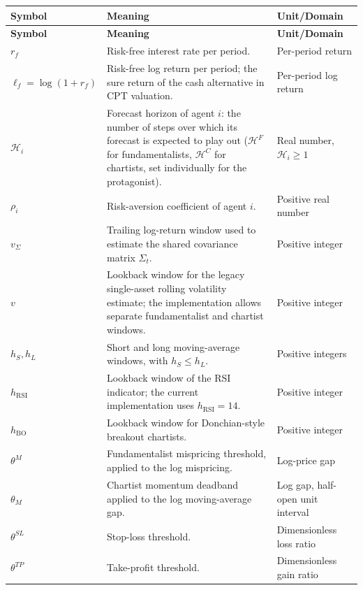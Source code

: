 \documentclass[12pt, a4paper]{article}
\begin{document}
    \begin{longtable}{@{}L{0.22\textwidth}L{0.50\textwidth}L{0.20\textwidth}@{}}
        \toprule
        \textbf{Symbol} & \textbf{Meaning} & \textbf{Unit/Domain} \\
        \midrule
        \endfirsthead
        \toprule
        \textbf{Symbol} & \textbf{Meaning} & \textbf{Unit/Domain} \\
        \midrule
        \endhead
        \(r_f\) & Risk-free interest rate per period. & Per-period return \\
        \(\ell_f=\log(1+r_f)\) & Risk-free log return per period; the sure return of the cash alternative in CPT valuation. & Per-period log return \\
        \(\mathcal H_i\) & Forecast horizon of agent \(i\): the number of steps over which its forecast is expected to play out (\(\mathcal H^F\) for fundamentalists, \(\mathcal H^C\) for chartists, set individually for the protagonist). & Real number, \(\mathcal H_i\ge1\) \\
        \(\rho_i\) & Risk-aversion coefficient of agent \(i\). & Positive real number \\
        \(v_{\Sigma}\) & Trailing log-return window used to estimate the shared covariance matrix \(\Sigma_t\). & Positive integer \\
        \(v\) & Lookback window for the legacy single-asset rolling volatility estimate; the implementation allows separate fundamentalist and chartist windows. & Positive integer \\
        \(h_S,h_L\) & Short and long moving-average windows, with \(h_S\le h_L\). & Positive integers \\
        \(h_{\mathrm{RSI}}\) & Lookback window of the RSI indicator; the current implementation uses \(h_{\mathrm{RSI}}=14\). & Positive integer \\
        \(h_{\mathrm{BO}}\) & Lookback window for Donchian-style breakout chartists. & Positive integer \\
        \(\theta^M\) & Fundamentalist mispricing threshold, applied to the log mispricing. & Log-price gap \\
        \(\theta_M\) & Chartist momentum deadband applied to the log moving-average gap. & Log gap, half-open unit interval \\
        \(\theta^{SL}\) & Stop-loss threshold. & Dimensionless loss ratio \\
        \(\theta^{TP}\) & Take-profit threshold. & Dimensionless gain ratio \\

\end{longtable}
\end{document}
